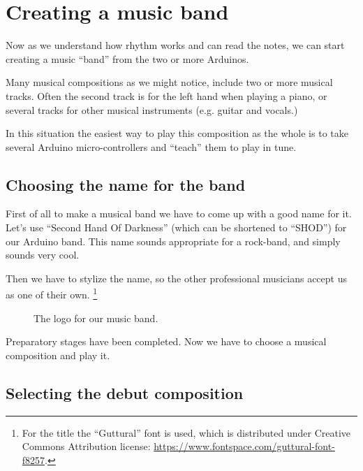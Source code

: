 \documentclass[../sparc.tex]{subfiles}
\begin{document}
\newpage
\section{Creating a music band}

Now as we understand how rhythm works and can read the notes, we can start
creating a music ``band'' from the two or more Arduinos.

Many musical compositions as we might notice, include two or more musical
tracks.  Often the second track is for the left hand when playing a piano, or
several tracks for other musical instruments (e.g. guitar and vocals.)

In this situation the easiest way to play this composition as the whole is to
take several Arduino micro-controllers and ``teach'' them to play in tune.

\subsection{Choosing the name for the band}

First of all to make a musical band we have to come up with a good name for it.
Let's use ``Second Hand Of Darkness'' (which can be shortened to ``SHOD'') for
our Arduino band.  This name sounds appropriate for a rock-band, and simply
sounds very cool.

Then we have to stylize the name, so the other professional musicians accept us
as one of their own. \footnote{For the title the ``Guttural'' font is used,
which is distributed under Creative Commons Attribution license:
\url{https://www.fontspace.com/guttural-font-f8257}.}

\begin{figure}[ht]
  \centering
  
  \caption{The logo for our music band.}
  \label{fig:shod-band-logo}
\end{figure}

Preparatory stages have been completed.  Now we have to choose a musical
composition and play it.

\subsection{Selecting the debut composition}
\end{document}
